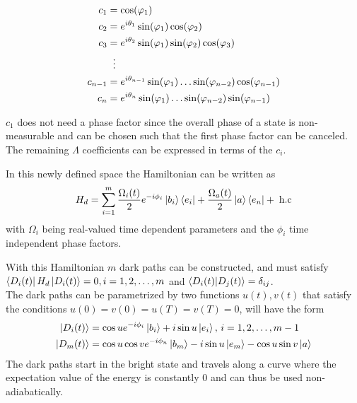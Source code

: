 \begin{equation}
\begin{aligned}
c_1 &= \cos(\varphi_1)
\\ 
c_2 &= e^{i\theta_1}\sin(\varphi_1)\cos(\varphi_2)
\\ 
c_3 &= e^{i\theta_2}\sin(\varphi_1)\sin(\varphi_2)\cos(\varphi_3)
\\
&\hspace{2mm}\vdots
\\
c_{n-1} &= e^{i\theta_{n-1}}\sin(\varphi_1)\dots\sin(\varphi_{n-2})\cos(\varphi_{n-1})
\\
c_{n} &= e^{i\theta_{n}}\sin(\varphi_1)\dots\sin(\varphi_{n-2})\sin(\varphi_{n-1})
\end{aligned}
\end{equation}

$c_1$ does not need a phase factor since the overall phase of a state is non-measurable and can be chosen such that the first phase factor can be canceled. The remaining $\Lambda$ coefficients can be expressed in terms of the $c_i$.

In this newly defined space the Hamiltonian can be written as
\begin{equation}
H_d = \sum_{i = 1}^m \frac{\Omega_i(t)}{2}e^{-i\phi_i}\ket{b_i}\bra{e_i} + \frac{\Omega_a(t)}{2}\ket{a}\bra{e_n} +\;\text{h.c}
\label{eq:HamdN}
\end{equation}
with $\Omega_i$ being real-valued time dependent parameters and the $\phi_i$ time independent phase factors.

With this Hamiltonian $m$ dark paths can be constructed, and must satisfy $\bra{D_i(t)}H_d\ket{D_i(t)} = 0, i = 1,2,\dots,m$ and $\bra{D_i(t)}\ket{D_j(t)} = \delta_{ij}$.\\
The dark paths can be parametrized by two functions $u(t),v(t)$ that satisfy the conditions $u(0) = v(0) = u(T) = v(T) = 0$,  will have the form
\begin{equation}
\begin{aligned}
\ket{D_i(t)} &= \cos u e^{-i\phi_i}\ket{b_i} + i\sin u \ket{e_i},\, i = 1,2,\dots,m-1
\\
\ket{D_m(t)} &= \cos u \cos v e^{-i\phi_n}\ket{b_m} - i\sin u \ket{e_m} - \cos u \sin v \ket{a}
\end{aligned}
\end{equation}
The dark paths start in the bright state and travels along a curve where the expectation value of the energy is constantly $0$ and can thus be used non-adiabatically.

